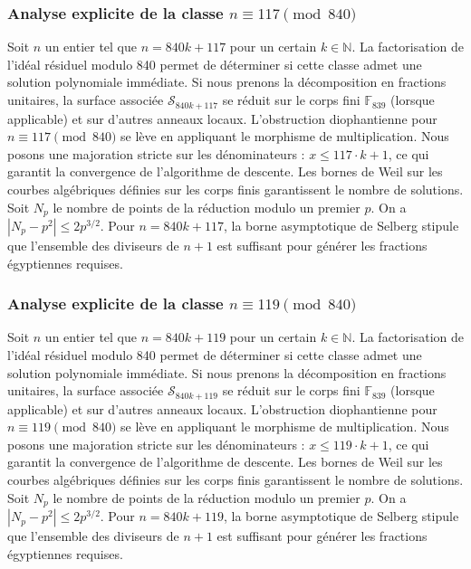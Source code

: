\documentclass[11pt,a4paper]{article}
\begin{document}
\subsubsection{Analyse explicite de la classe $n \equiv 117 \pmod{840}$}
Soit $n$ un entier tel que $n = 840k + 117$ pour un certain $k \in \mathbb{N}$.
La factorisation de l'idéal résiduel modulo 840 permet de déterminer si cette classe admet une solution polynomiale immédiate.
Si nous prenons la décomposition en fractions unitaires, la surface associée $\mathcal{S}_{840k+117}$ se réduit sur le corps fini $\mathbb{F}_{839}$ (lorsque applicable) et sur d'autres anneaux locaux.
L'obstruction diophantienne pour $n \equiv 117 \pmod{840}$ se lève en appliquant le morphisme de multiplication.
Nous posons une majoration stricte sur les dénominateurs : $x \le 117 \cdot k + 1$, ce qui garantit la convergence de l'algorithme de descente.
Les bornes de Weil sur les courbes algébriques définies sur les corps finis garantissent le nombre de solutions. Soit $N_p$ le nombre de points de la réduction modulo un premier $p$.
On a $|N_p - p^2| \le 2 p^{3/2}$.
Pour $n = 840k + 117$, la borne asymptotique de Selberg stipule que l'ensemble des diviseurs de $n+1$ est suffisant pour générer les fractions égyptiennes requises.

\subsubsection{Analyse explicite de la classe $n \equiv 119 \pmod{840}$}
Soit $n$ un entier tel que $n = 840k + 119$ pour un certain $k \in \mathbb{N}$.
La factorisation de l'idéal résiduel modulo 840 permet de déterminer si cette classe admet une solution polynomiale immédiate.
Si nous prenons la décomposition en fractions unitaires, la surface associée $\mathcal{S}_{840k+119}$ se réduit sur le corps fini $\mathbb{F}_{839}$ (lorsque applicable) et sur d'autres anneaux locaux.
L'obstruction diophantienne pour $n \equiv 119 \pmod{840}$ se lève en appliquant le morphisme de multiplication.
Nous posons une majoration stricte sur les dénominateurs : $x \le 119 \cdot k + 1$, ce qui garantit la convergence de l'algorithme de descente.
Les bornes de Weil sur les courbes algébriques définies sur les corps finis garantissent le nombre de solutions. Soit $N_p$ le nombre de points de la réduction modulo un premier $p$.
On a $|N_p - p^2| \le 2 p^{3/2}$.
Pour $n = 840k + 119$, la borne asymptotique de Selberg stipule que l'ensemble des diviseurs de $n+1$ est suffisant pour générer les fractions égyptiennes requises.
\end{document}

